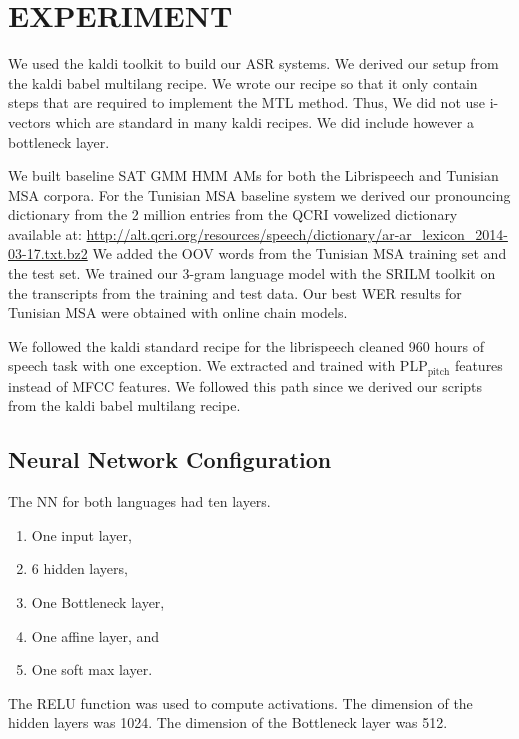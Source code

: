\section{EXPERIMENT}
\label{sec-4}

We used the kaldi toolkit\cite{Povey11thekaldi} to build our ASR systems. 
We derived our setup from the kaldi babel multilang recipe. 
We  wrote our recipe so that  it only contain  steps that are required to implement the \gls{MTL} method. 
Thus, We did not use i-vectors which are standard in many kaldi recipes. 
We did include however a bottleneck layer. 

We built baseline \gls{SAT} \gls{GMM} \gls{HMM} \gls{AM}s for both the Librispeech and Tunisian \gls{MSA} corpora.
For the Tunisian \gls{MSA} baseline system we derived our pronouncing dictionary from the 2 million entries from the \gls{QCRI} vowelized dictionary\cite{aaliArabicKaldi} available at:
\url{http://alt.qcri.org/resources/speech/dictionary/ar-ar_lexicon_2014-03-17.txt.bz2}
We added the \gls{OOV} words from the Tunisian \gls{MSA} training set and the test set. 
We trained our $3$-gram language model with the \gls{SRILM} toolkit\cite{Stolcke02srilm-} on the transcripts from the training and test data. 
Our best \gls{WER} results for Tunisian \gls{MSA} were obtained with online chain models.

We followed the kaldi standard recipe for the librispeech cleaned 960 hours of speech task with one exception. 
We extracted and trained with \gls{PLP}$_{\text{pitch}}$ features instead of \gls{MFCC} features. 
We followed this path since we derived our scripts from the kaldi babel multilang recipe. 

\subsection{Neural Network Configuration}
\label{sec:nnconfig}


The \gls{NN} for both languages had ten layers.

\begin{enumerate}
\item One input layer,
\item 6 hidden layers,
\item One Bottleneck layer,
\item One affine layer, and
\item One soft max layer.
\end{enumerate}


The \gls{RELU} function was used to compute activations.
The dimension of the hidden layers was 1024.
The dimension of the Bottleneck layer was 512.

